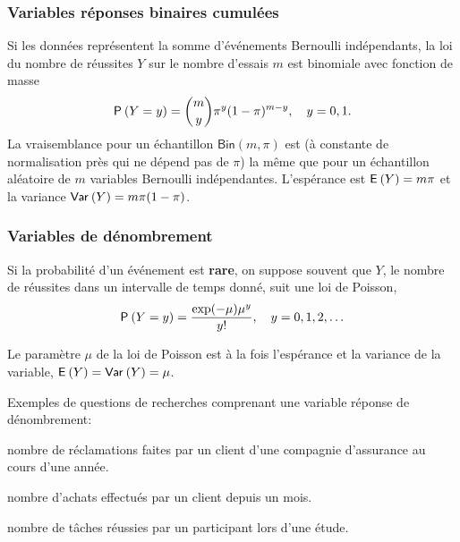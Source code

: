 \documentclass{beamer}
\begin{document}
\begin{frame}
\frametitle{Variables réponses binaires cumulées}
Si les données représentent la somme d'événements Bernoulli indépendants, la loi du nombre de réussites $Y$ sur le nombre d'essais $m$ est binomiale avec fonction de masse
\begin{align*}
\P{Y=y} = \binom{m}{y}\pi^y (1-\pi)^{m-y}, \quad y=0, 1.
\end{align*}
La vraisemblance pour un échantillon $\mathsf{Bin}(m, \pi)$  est (à constante de normalisation près qui ne dépend pas de $\pi$) la même que pour un échantillon aléatoire de $m$ variables Bernoulli indépendantes. L'espérance est $\E{Y}=m\pi$ et la variance $\Va{Y}=m\pi(1-\pi)$. 
\end{frame}
\begin{frame}
\frametitle{Variables de dénombrement}
\bi
\item \alert{Si la probabilité d'un événement est \textbf{rare}}, on suppose souvent que $Y$, le nombre de réussites dans un intervalle de temps donné, suit une loi de \alert{Poisson},
\begin{align*}
\P{Y=y} = \frac{\exp(-\mu)\mu^y}{y!}, \quad y=0, 1, 2, \ldots
\end{align*}
\item Le paramètre $\mu$ de la loi de Poisson est à la fois l'espérance et la variance de la variable,  $\E{Y}=\Va{Y}=\mu$.
\item Exemples de questions de recherches comprenant une variable réponse de dénombrement: 
\bi
\item nombre de réclamations faites par un client d'une compagnie d'assurance
au cours d'une année.
\item  nombre d'achats effectués par un client depuis un mois.
\item nombre de tâches réussies par un participant lors d'une étude.
\ei
\ei
\end{frame} 
\end{document}
